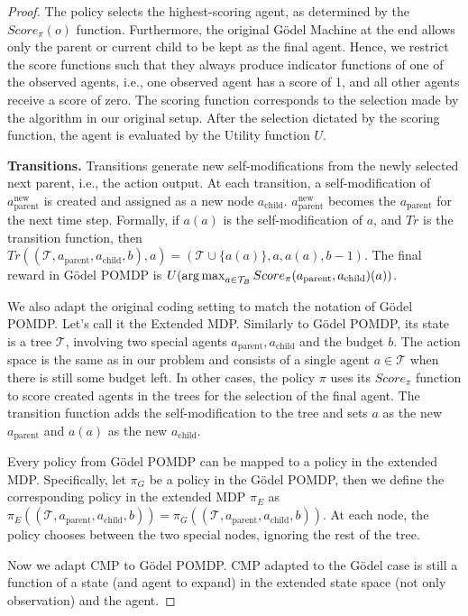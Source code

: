 \documentclass{article} %
\begin{document}
\begin{proof}
The policy selects the highest-scoring agent, as determined by the $Score_\pi(o)$ function. Furthermore, the original G\"odel Machine at the end allows only the parent or current child to be kept as the final agent. Hence, we restrict the score functions such that they always produce indicator functions of one of the observed agents, i.e., one observed agent has a score of 1, and all other agents receive a score of zero. The scoring function corresponds to the selection made by the algorithm in our original setup. After the selection dictated by the scoring function, the agent is evaluated by the Utility function $U$.


\textbf{Transitions.}
Transitions generate new self-modifications from the newly selected next parent, i.e., the action output. At each transition, a self-modification of $a^\text{new}_\text{parent}$ is created and assigned as a new node $a_\text{child}$. $a^\text{new}_\text{parent}$ becomes the $a_\text{parent}$ for the next time step.
Formally, if $a(a)$ is the self-modification of $a$, and $Tr$ is the transition function, then $Tr((\mathcal{T}, a_\text{parent}, a_\text{child}, b), a) = (\mathcal{T} \cup \{a(a)\}, a, a(a), b-1)$. The final reward in G\"odel POMDP is $U(\operatorname*{arg\,max}_{a \in \mathcal{T}_B} Score_\pi(a_\text{parent}, a_\text{child})(a))$. 


We also adapt the original coding setting to match the notation of G\"odel POMDP. Let's call it the Extended MDP. Similarly to G\"odel POMDP, its state is a tree $\mathcal{T}$, involving two special agents $a_\text{parent}, a_\text{child}$ and the budget $b$. The action space is the same as in our problem and consists of a single agent $a \in \mathcal{T}$ when there is still some budget left.
In other cases, the policy $\pi$ uses its $Score_\pi$ function to score created agents in the trees for the selection of the final agent. The transition function adds the self-modification to the tree and sets $a$ as the new $a_\text{parent}$ and $a(a)$ as the new $a_\text{child}$.

Every policy from G\"odel POMDP can be mapped to a policy in the extended MDP. Specifically, let $\pi_G$ be a policy in the G\"odel POMDP, then we define the corresponding policy in the extended MDP $\pi_E$ as $\pi_E((\mathcal{T}, a_\text{parent}, a_\text{child}, b)) = \pi_G((\mathcal{T}, a_\text{parent},a_\text{child}, b))$. At each node, the policy chooses between the two special nodes, ignoring the rest of the tree. 

 

Now we adapt $\mathrm{CMP}$ to G\"odel POMDP. $\mathrm{CMP}$ adapted to the G\"odel case is still a function of a state (and agent to expand) in the extended state space (not only observation) and the agent.


\end{proof}
\end{document}
